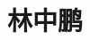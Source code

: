 \documentclass{moderncv}%
\title{林中鹏}
\begin{document}
\begin{CJK}{UTF8}{gbsn}                       %
\maketitle




% 



\nocite{*}

% 
% 

\clearpage
\end{CJK}
\end{document}
